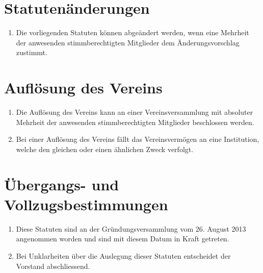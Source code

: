 \documentclass[10pt,a4paper,parskip,fleqn]{scrartcl}
\newcommand{\ol}{\begin{enumerate}[itemsep=-0.2em,topsep=-0.2em]}
\newcommand{\lo}{\end{enumerate}}
\newcommand{\li}{\item}
\begin{document}
\section{Statutenänderungen}

\ol
	\li Die vorliegenden Statuten können abgeändert werden, wenn eine Mehrheit der
	anwesenden stimmberechtigten Mitglieder dem Änderungsvorschlag zustimmt.
\lo


\section{Auflösung des Vereins}

\ol
	\li Die Auflösung des Vereins kann an einer Vereinsversammlung mit absoluter
	Mehrheit der anwesenden stimmberechtigten Mitglieder beschlossen werden.
	\li Bei einer Auflösung des Vereins fällt das Vereinsvermögen an eine
	Institution, welche den gleichen oder einen ähnlichen Zweck verfolgt.
\lo


\section{Übergangs- und Vollzugsbestimmungen}

\ol
	\li Diese Statuten sind an der Gründungsversammlung vom 26. August 2013
	angenommen worden und sind mit diesem Datum in Kraft getreten.
	\li Bei Unklarheiten über die Auslegung dieser Statuten entscheidet der
	Vorstand abschliessend.
\lo
\end{document}
